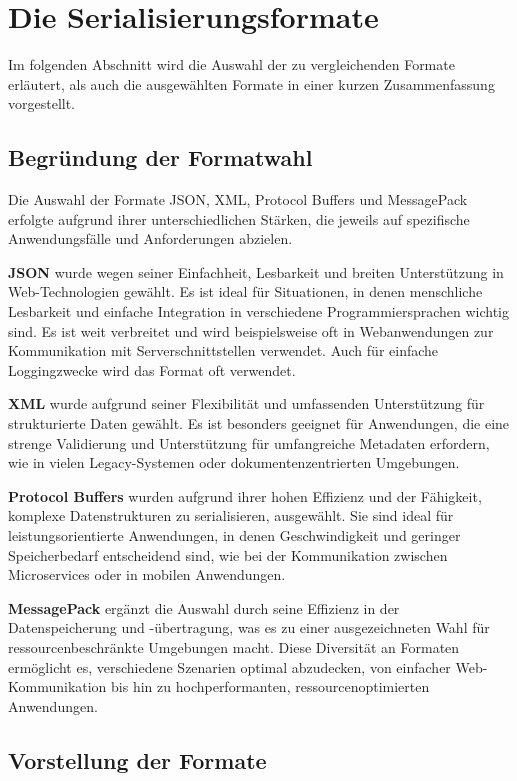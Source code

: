 \documentclass[ngerman]{seminarvorlage}
\begin{document}
\section{Die Serialisierungsformate}

Im folgenden Abschnitt wird die Auswahl der zu vergleichenden Formate erläutert, als auch die ausgewählten Formate in einer kurzen Zusammenfassung vorgestellt.

\subsection{Begründung der Formatwahl}

Die Auswahl der Formate JSON, XML, Protocol Buffers und MessagePack erfolgte aufgrund ihrer unterschiedlichen Stärken, die jeweils auf spezifische Anwendungsfälle und Anforderungen abzielen.

\textbf{JSON} \cite{rfc8259} wurde wegen seiner Einfachheit, Lesbarkeit und breiten Unterstützung in Web-Technologien gewählt. Es ist ideal für Situationen, in denen menschliche Lesbarkeit und einfache Integration in verschiedene Programmiersprachen wichtig sind. Es ist weit verbreitet und wird beispielsweise oft in Webanwendungen zur Kommunikation mit Serverschnittstellen verwendet. Auch für einfache Loggingzwecke wird das Format oft verwendet.

\textbf{XML} \cite{w3c_xml} wurde aufgrund seiner Flexibilität und umfassenden Unterstützung für strukturierte Daten gewählt. Es ist besonders geeignet für Anwendungen, die eine strenge Validierung und Unterstützung für umfangreiche Metadaten erfordern, wie in vielen Legacy-Systemen oder dokumentenzentrierten Umgebungen.

\textbf{Protocol Buffers} \cite{protobuf} wurden aufgrund ihrer hohen Effizienz und der Fähigkeit, komplexe Datenstrukturen zu serialisieren, ausgewählt. Sie sind ideal für leistungsorientierte Anwendungen, in denen Geschwindigkeit und geringer Speicherbedarf entscheidend sind, wie bei der Kommunikation zwischen Microservices oder in mobilen Anwendungen.

\textbf{MessagePack} \cite{msgpack} ergänzt die Auswahl durch seine Effizienz in der Datenspeicherung und -übertragung, was es zu einer ausgezeichneten Wahl für ressourcenbeschränkte Umgebungen macht. Diese Diversität an Formaten ermöglicht es, verschiedene Szenarien optimal abzudecken, von einfacher Web-Kommunikation bis hin zu hochperformanten, ressourcenoptimierten Anwendungen.

\subsection{Vorstellung der Formate}
\end{document}
